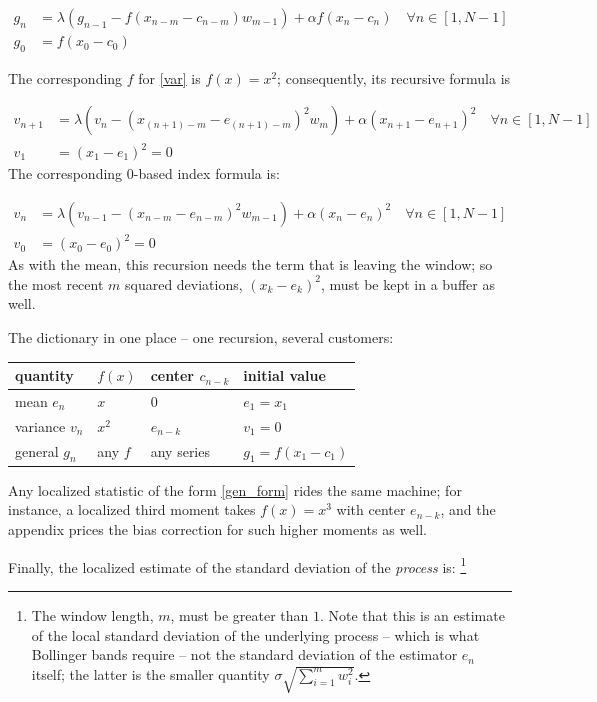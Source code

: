 \documentclass{article}
\begin{document}
\begin{align}
    g_{n} &=  \lambda \left( g_{n-1} - f(x_{n-m} - c_{n-m}) w_{m-1} \right) + \alpha f(x_{n} - c_n) \quad \forall n \in [1, N-1] \\
    g_0   &=  f(x_0 - c_0) 
\end{align}

The corresponding $f$ for \eqref{var} is $f(x) = x^2$;
consequently, its recursive formula is 

\begin{align}
    v_{n+1} &= \lambda \left( v_n -  ( x_{(n+1)-m} - e_{(n+1)-m} )^2 w_m \right) + \alpha( x_{n+1} - e_{n+1} )^2 \quad \forall n \in [1, N-1] \\
    v_1     &=  (x_1 - e_1)^2 = 0 
\end{align}
The corresponding 0-based index formula is:

\begin{align}
    v_{n} &= \lambda \left( v_{n-1} - ( x_{n-m} - e_{n-m} )^2 w_{m-1}\right) + \alpha ( x_{n} - e_{n} )^2 \quad \forall n \in [1, N-1] \\
    v_0   &= (x_0 - e_0)^2 = 0
\end{align}
As with the mean, this recursion needs the term that is leaving the window;
so the most recent $m$ squared deviations, $(x_k - e_k)^2$, must be kept in
a buffer as well.

The dictionary in one place -- one recursion, several customers:
\begin{center}
\begin{tabular}{l|l|l|l}
{\bf quantity} & {\bf $f(x)$} & {\bf center $c_{n-k}$} & {\bf initial value} \\
\hline
mean $e_n$ & $x$ & $0$ & $e_1 = x_1$ \\
variance $v_n$ & $x^2$ & $e_{n-k}$ & $v_1 = 0$ \\
general $g_n$ & any $f$ & any series & $g_1 = f(x_1 - c_1)$ \\
\end{tabular}
\end{center}
Any localized statistic of the form \eqref{gen_form} rides the same
machine; for instance, a localized third moment takes $f(x) = x^3$ with
center $e_{n-k}$, and the appendix prices the bias correction for such
higher moments as well.

Finally, the localized estimate of the standard deviation of the
{\em process\/} is:%
\footnote{The window length, $m$, must be greater than $1$. Note that this is
an estimate of the local standard deviation of the underlying process -- which
is what Bollinger bands require -- not the standard deviation of the estimator
$e_n$ itself; the latter is the smaller quantity
$\sigma \sqrt{\sum_{i=1}^m w_i^2}$.}
\end{document}

